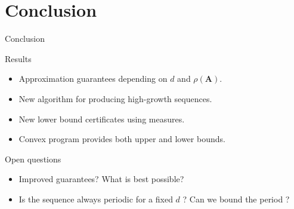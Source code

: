 \documentclass{beamer}
\newcommand{\Adj}{\mathbf{A}}
\begin{document}
  \section{Conclusion}
  \begin{frame}{Conclusion}
    \begin{block}{Results}
      \begin{itemize}
        \item Approximation guarantees depending on $d$ and $\rho(\Adj)$.
        \item New algorithm for producing high-growth sequences.
        \item New lower bound certificates using measures.
        \item Convex program provides both upper and lower bounds.
      \end{itemize}
    \end{block}
    \begin{block}{Open questions}
      \begin{itemize}
        \item Improved guarantees? What is best possible?
        \item Is the sequence always periodic for a fixed $d$ ? Can we bound the period ?
      \end{itemize}
    \end{block}
  \end{frame}

  
  
\end{document}
